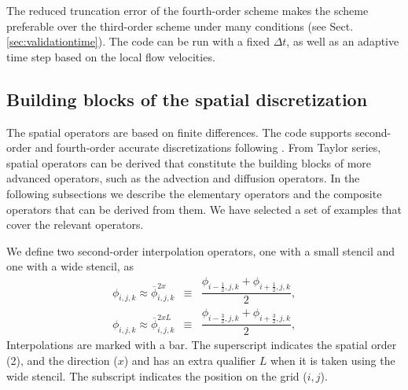 \documentclass[gmd,manuscript]{copernicus}
\begin{document}
The reduced truncation error of the fourth-order scheme makes the scheme preferable over the third-order scheme under many conditions (see Sect. \ref{sec:validationtime}). The code can be run with a fixed $\Delta t$, as well as an adaptive time step based on the local flow velocities.

\subsection{Building blocks of the spatial discretization}\label{sec:buiding_blocks}
The spatial operators are based on finite differences. The code supports second-order and fourth-order accurate discretizations following \citet{Morinishi1998, Vasilyev2000}. From Taylor series, spatial operators can be derived that constitute the building blocks of more advanced operators, such as the advection and diffusion operators. In the following subsections we describe the elementary operators and the composite operators that can be derived from them. We have selected a set of examples that cover the relevant operators.

We define two second-order interpolation operators, one with a small stencil and one with a wide stencil, as
\begin{eqnarray}
\phi_{i,j,k} \approx \overline{\phi}^{2x }_{i,j,k} & \equiv & \dfrac{\phi_{i-\frac{1}{2},j,k} + \phi_{i+\frac{1}{2},j,k}}{2},\\
\phi_{i,j,k} \approx \overline{\phi}^{2xL}_{i,j,k} & \equiv & \dfrac{\phi_{i-\frac{3}{2},j,k} + \phi_{i+\frac{3}{2},j,k}}{2},
\end{eqnarray}
Interpolations are marked with a bar. The superscript indicates the spatial order (2), and the direction ($x$) and has an extra qualifier $L$ when it is taken using the wide stencil. The subscript indicates the position on the grid ($i,j$).
\end{document}
